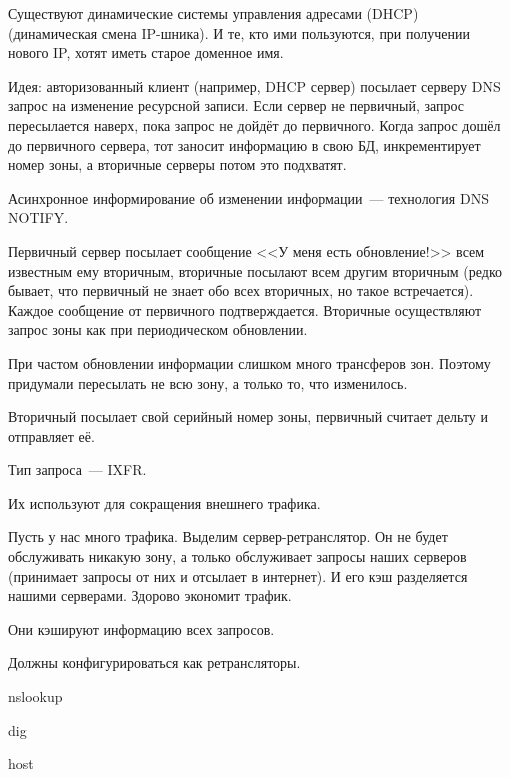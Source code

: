 Существуют динамические системы управления адресами (DHCP) (динамическая смена IP-шника). И те, кто ими пользуются, при получении нового IP, хотят иметь старое доменное имя.

Идея: авторизованный клиент (например, DHCP сервер) посылает серверу DNS запрос на изменение ресурсной записи. Если сервер не первичный, запрос пересылается наверх, пока запрос не дойдёт до первичного. Когда запрос дошёл до первичного сервера, тот заносит информацию в свою БД, инкрементирует номер зоны, а вторичные серверы потом это подхватят.


Асинхронное информирование об изменении информации~--- технология DNS NOTIFY.

Первичный сервер посылает сообщение <<У меня есть обновление!>> всем известным ему вторичным, вторичные посылают всем другим вторичным (редко бывает, что первичный не знает обо всех вторичных, но такое встречается). Каждое сообщение от первичного подтверждается. Вторичные осуществляют запрос зоны как при периодическом обновлении.


При частом обновлении информации слишком много трансферов зон. Поэтому придумали пересылать не всю зону, а только то, что изменилось.

Вторичный посылает свой серийный номер зоны, первичный считает дельту и отправляет её.

Тип запроса~--- IXFR.



Их используют для сокращения внешнего трафика.

Пусть у нас много трафика. Выделим сервер-ретранслятор. Он не будет обслуживать никакую зону, а только обслуживает запросы наших серверов (принимает запросы от них и отсылает в интернет). И его кэш разделяется нашими серверами. Здорово экономит трафик.

Они кэшируют информацию всех запросов.

Должны конфигурироваться как ретрансляторы.


\begin{MyItemize}
    \item nslookup
    \item dig
    \item host
\end{MyItemize}

